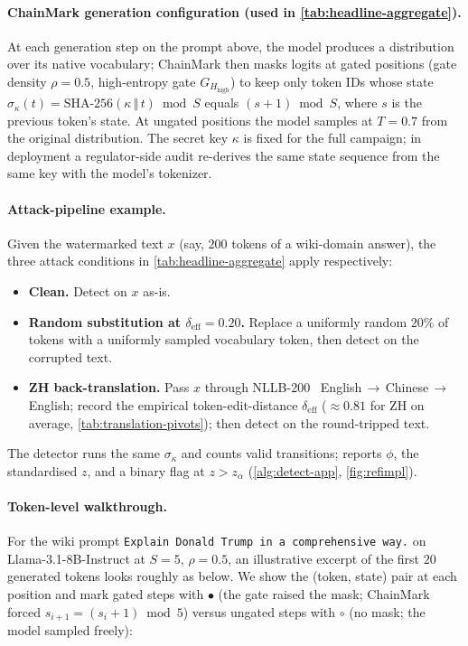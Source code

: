 \paragraph{ChainMark generation configuration (used in
\autoref{tab:headline-aggregate}).}
At each generation step on the prompt above, the model produces a
distribution over its native vocabulary; ChainMark then masks logits
at gated positions (gate density $\rho{=}0.5$, high-entropy gate
$G_{H_{\mathrm{high}}}$) to keep only token IDs whose state
$\sigma_\kappa(t) = \mathrm{SHA\text{-}256}(\kappa\,\Vert\,t) \bmod
S$ equals $(s+1) \bmod S$, where $s$ is the previous token's state.
At ungated positions the model samples at $T{=}0.7$ from the original
distribution. The secret key $\kappa$ is fixed for the full
campaign; in deployment a regulator-side audit re-derives the same
state sequence from the same key with the model's tokenizer.

\paragraph{Attack-pipeline example.} Given the watermarked text $x$
(say, $200$ tokens of a wiki-domain answer), the three attack
conditions in \autoref{tab:headline-aggregate} apply respectively:
\begin{itemize}[nosep, leftmargin=*]
  \item \textbf{Clean.} Detect on $x$ as-is.
  \item \textbf{Random substitution at $\delta_{\mathrm{eff}}{=}0.20$.}
    Replace a uniformly random $20\%$ of tokens with a uniformly
    sampled vocabulary token, then detect on the corrupted text.
  \item \textbf{ZH back-translation.} Pass $x$ through
    NLLB-200~\citep{nllbteam2022nllb}
    English\,$\rightarrow$\,Chinese\,$\rightarrow$\,English; record the
    empirical token-edit-distance $\delta_{\mathrm{eff}}$
    ($\approx 0.81$ for ZH on average,
    \autoref{tab:translation-pivots}); then detect on the
    round-tripped text.
\end{itemize}
The detector runs the same $\sigma_\kappa$ and counts valid
transitions; reports $\phi$, the standardised $z$, and a binary
flag at $z>z_\alpha$ (\autoref{alg:detect-app},
\autoref{fig:refimpl}).

\paragraph{Token-level walkthrough.}
For the wiki prompt \texttt{Explain Donald Trump in a comprehensive
way.} on Llama-3.1-8B-Instruct at $S{=}5$, $\rho{=}0.5$, an
illustrative excerpt of the first $20$ generated tokens looks
roughly as below. We show the (token, state) pair at each position
and mark gated steps with $\bullet$ (the gate raised the mask;
ChainMark forced $s_{i+1} = (s_i{+}1)\bmod 5$) versus ungated steps
with $\circ$ (no mask; the model sampled freely):

